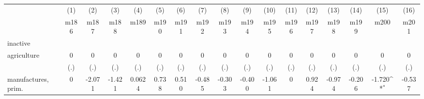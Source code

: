 {
\def\sym#1{\ifmmode^{#1}\else\(^{#1}\)\fi}
\begin{tabular}{l*{16}{c}}
\hline\hline
                    &\multicolumn{1}{c}{(1)}&\multicolumn{1}{c}{(2)}&\multicolumn{1}{c}{(3)}&\multicolumn{1}{c}{(4)}&\multicolumn{1}{c}{(5)}&\multicolumn{1}{c}{(6)}&\multicolumn{1}{c}{(7)}&\multicolumn{1}{c}{(8)}&\multicolumn{1}{c}{(9)}&\multicolumn{1}{c}{(10)}&\multicolumn{1}{c}{(11)}&\multicolumn{1}{c}{(12)}&\multicolumn{1}{c}{(13)}&\multicolumn{1}{c}{(14)}&\multicolumn{1}{c}{(15)}&\multicolumn{1}{c}{(16)}\\
                    &\multicolumn{1}{c}{m186}&\multicolumn{1}{c}{m187}&\multicolumn{1}{c}{m188}&\multicolumn{1}{c}{m189}&\multicolumn{1}{c}{m190}&\multicolumn{1}{c}{m191}&\multicolumn{1}{c}{m192}&\multicolumn{1}{c}{m193}&\multicolumn{1}{c}{m194}&\multicolumn{1}{c}{m195}&\multicolumn{1}{c}{m196}&\multicolumn{1}{c}{m197}&\multicolumn{1}{c}{m198}&\multicolumn{1}{c}{m199}&\multicolumn{1}{c}{m200}&\multicolumn{1}{c}{m201}\\
\hline
inactive            &                     &                     &                     &                     &                     &                     &                     &                     &                     &                     &                     &                     &                     &                     &                     &                     \\
agriculture         &           0         &           0         &           0         &           0         &           0         &           0         &           0         &           0         &           0         &           0         &           0         &           0         &           0         &           0         &           0         &           0         \\
                    &         (.)         &         (.)         &         (.)         &         (.)         &         (.)         &         (.)         &         (.)         &         (.)         &         (.)         &         (.)         &         (.)         &         (.)         &         (.)         &         (.)         &         (.)         &         (.)         \\
[1em]
manufactures, prim. &           0         &      -2.071         &      -1.421         &      0.0624         &       0.738         &       0.510         &      -0.485         &      -0.303         &      -0.400         &      -1.061         &           0         &       0.924         &      -0.974         &      -0.206         &      -1.720\sym{*}  &      -0.537         \\

\end{tabular}}
